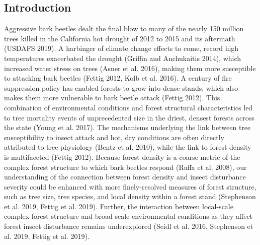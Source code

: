 \documentclass[]{article}
\begin{document}
\subsection{Introduction}\label{introduction}

Aggressive bark beetles dealt the final blow to many of the nearly 150
million trees killed in the California hot drought of 2012 to 2015 and
its aftermath (USDAFS 2019). A harbinger of climate change effects to
come, record high temperatures exacerbated the drought (Griffin and
Anchukaitis 2014), which increased water stress on trees (Asner et al.
2016), making them more susceptible to attacking bark beetles (Fettig
2012, Kolb et al. 2016). A century of fire suppression policy has
enabled forests to grow into dense stands, which also makes them more
vulnerable to bark beetle attack (Fettig 2012). This combination of
environmental conditions and forest structural characteristics led to
tree mortality events of unprecedented size in the driest, densest
forests across the state (Young et al. 2017). The mechanisms underlying
the link between tree susceptibility to insect attack and hot, dry
conditions are often directly attributed to tree physiology (Bentz et
al. 2010), while the link to forest density is multifaceted (Fettig
2012). Because forest density is a coarse metric of the complex forest
structure to which bark beetles respond (Raffa et al. 2008), our
understanding of the connection between forest density and insect
disturbance severity could be enhanced with more finely-resolved
measures of forest structure, such as tree size, tree species, and local
density within a forest stand (Stephenson et al. 2019, Fettig et al.
2019). Further, the interaction between local-scale complex forest
structure and broad-scale environmental conditions as they affect forest
insect disturbance remains underexplored (Seidl et al. 2016, Stephenson
et al. 2019, Fettig et al. 2019).
\end{document}
